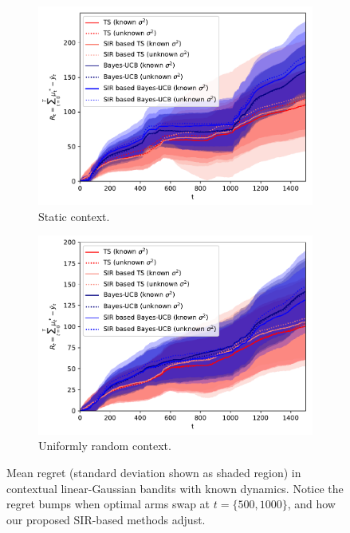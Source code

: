 \documentclass{article}
\begin{document}
\begin{figure}[!h]
	\centering
	\begin{subfigure}[b]{0.49\textwidth}
		\includegraphics[width=\textwidth]{./figs/dynamic/linearGaussian/cumulative_regret_all_dknown_cstatic}
		\caption{Static context.}
		\label{fig:dynamic_bandits_linearGaussian_cstatic_dknown}
	\end{subfigure}
	\begin{subfigure}[b]{0.49\textwidth}
		\includegraphics[width=\textwidth]{./figs/dynamic/linearGaussian/cumulative_regret_all_dknown_crand}
		\caption{Uniformly random context.}
		\label{fig:dynamic_bandits_linearGaussian_crand_dknown}
	\end{subfigure}
	\caption{Mean regret (standard deviation shown as shaded region) in contextual linear-Gaussian bandits with known dynamics. Notice the regret bumps when optimal arms swap at $t=\{500, 1000\}$, and how our proposed SIR-based methods adjust.}
	\label{fig:dynamic_bandits_linearGaussian_dknown}
\end{figure}
\end{document}
